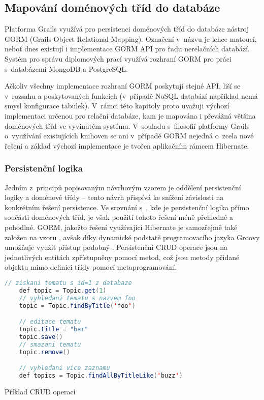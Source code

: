 \subsection{Mapování doménových tříd do databáze}
Platforma Grails využívá pro persistenci doménových tříd do databáze nástroj GORM (Grails Object Relational Mapping). Označení  v~názvu je lehce matoucí, neboť dnes existují i implementace GORM API pro řadu nerelačních databází. Systém pro správu diplomových prací využívá rozhraní GORM pro práci s~databázemi MongoDB a PostgreSQL.


Ačkoliv všechny implementace rozhraní GORM poskytují stejné API, liší se v~rozsahu a poskytovaných funkcích (v~případě NoSQL databází například nemá smysl konfigurace tabulek). V~rámci této kapitoly proto uvažuji výchozí implementaci určenou pro relační databáze, kam je mapována i převážná většina doménových tříd ve vyvinutém systému. V~souladu s~filosofií platformy Grails o~využívání existujících knihoven se ani v~případě GORM nejedná o~zcela nové řešení a základ výchozí implementace je tvořen aplikačním rámcem Hibernate.

\subsubsection{\textbf{Persistenční logika}}
Jedním z~principů popisovaným návrhovým vzorem  je oddělení persistenční logiky a doménové třídy -- tento návrh přispívá ke snížení závislosti na konkrétním řešení persistence. Ve srovnání s~, kde je persistenční logika přímo součásti doménových tříd, je však použití tohoto řešení méně přehledné a pohodlné. GORM, jakožto řešení využívající Hibernate je samozřejmě také založen na vzoru , avšak díky dynamické podstatě programovacího jazyka Groovy umožňuje využit přístup podobný . Persistenční CRUD operace jsou na jednotlivých entitách zpřístupněny pomocí  metod, což jsou metody přidané objektu mimo definici třídy pomocí metaprogramování.

\begin{example}
\centering
\begin{lstlisting}[language=Java]
    // ziskani tematu s id=1 z databaze
    def topic = Topic.get(1)
    // vyhledani tematu s nazvem foo
    topic = Topic.findByTitle('foo')

    // editace tematu
    topic.title = "bar"
    topic.save()
    // smazani tematu
    topic.remove()

    // vyhledani vice zaznamu
    def topics = Topic.findAllByTitleLike('buzz')
\end{lstlisting}
\caption{Příklad CRUD operací}
\end{example}


